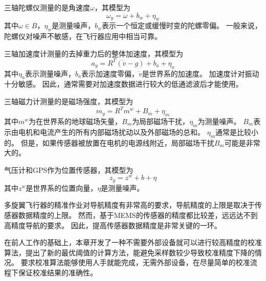 \documentclass[
  type=master
]{gdutthesis}
\begin{document}
三轴陀螺仪测量的是角速度$\omega$，其模型为
\begin{equation}\label{eq:gyromodel}
	\omega_y=\omega+b_w+\eta_w
\end{equation}
其中$\omega \in B$，$\eta_w$是测量噪声，$b_w$表示一个恒定或缓慢时变的陀螺零偏。
一般来说，陀螺仪对噪声不敏感，在飞行器应用中相当可靠。

三轴加速度计测量的去掉重力后的整体加速度，其模型为
\begin{equation}\label{eq:accmodel}
	a_y=R^T(\dot{v}-g)+b_a+\eta_a
\end{equation}
其中$\eta_a$表示测量噪声，$b_a$表示加速度零偏，$\dot{v}$是世界系的加速度。
加速度计对振动十分敏感。
因此，通常需要对加速度数据进行较大的低通滤波后才能使用。

三轴磁力计测量的是磁场强度，其模型为
\begin{equation}\label{eq:magmodel}
	m_y=R^T m^w+B_m+\eta_m
\end{equation}
其中$m^w$为在世界系的地球磁场矢量，$B_m$为局部磁场干扰，$\eta_m$为测量噪声。
$B_m$表示由电机和电流产生的所有内部磁场扰动以及外部磁场的总和。
$\eta_m$通常是比较小的。
但是，如果传感器被放置在电机的电源线附近，局部磁场干扰$B_m$可能是非常大的。

气压计和GPS作为位置传感器，其模型为
\begin{equation}\label{eq:magmodel}
	z_y=z^w+b+\eta
\end{equation}
其中$z^w$是世界系的位置向量，$\eta$是测量噪声。

多旋翼飞行器的精准作业对导航精度有非常高的要求，导航精度的上限是取决于传感器数据精度的上限。
然而，基于MEMS的传感器的精度都比较差，远远达不到高精度导航的要求。
因此，提高传感器数据精度是非常关键的一环。

在前人工作的基础上，本章开发了一种不需要外部设备就可以进行较高精度的校准算法，提出了新的最优阈值的计算方法，能避免采样数较少导致校准精度下降的情况。
要求校准算法能够使用人手就能完成，无需外部设备，在尽量简单的校准流程下保证校准结果的准确性。

\end{document}
